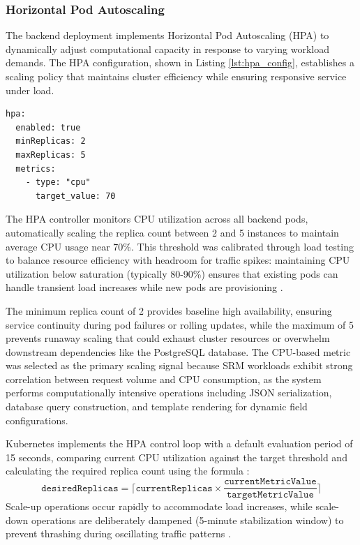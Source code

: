 \subsubsection{Horizontal Pod Autoscaling}

The backend deployment implements Horizontal Pod Autoscaling (HPA) to dynamically adjust computational capacity in response to varying workload demands. The HPA configuration, shown in Listing \ref{lst:hpa_config}, establishes a scaling policy that maintains cluster efficiency while ensuring responsive service under load.

\begin{listing}[htbp]
\begin{verbatim}
hpa:
  enabled: true
  minReplicas: 2
  maxReplicas: 5
  metrics:
    - type: "cpu"
      target_value: 70
\end{verbatim}
\caption{Horizontal Pod Autoscaler Configuration}
\label{lst:hpa_config}
\end{listing}

The HPA controller monitors CPU utilization across all backend pods, automatically scaling the replica count between 2 and 5 instances to maintain average CPU usage near 70\%. This threshold was calibrated through load testing to balance resource efficiency with headroom for traffic spikes: maintaining CPU utilization below saturation (typically 80-90\%) ensures that existing pods can handle transient load increases while new pods are provisioning \cite{nguyen2020horizontal}.

The minimum replica count of 2 provides baseline high availability, ensuring service continuity during pod failures or rolling updates, while the maximum of 5 prevents runaway scaling that could exhaust cluster resources or overwhelm downstream dependencies like the PostgreSQL database. The CPU-based metric was selected as the primary scaling signal because SRM workloads exhibit strong correlation between request volume and CPU consumption, as the system performs computationally intensive operations including JSON serialization, database query construction, and template rendering for dynamic field configurations.

Kubernetes implements the HPA control loop with a default evaluation period of 15 seconds, comparing current CPU utilization against the target threshold and calculating the required replica count using the formula \cite{nguyen2020horizontal}: 
$$
\texttt{desiredReplicas} = \lceil \texttt{currentReplicas} \times \frac{\texttt{currentMetricValue}}{\texttt{targetMetricValue}} \rceil
$$ 
Scale-up operations occur rapidly to accommodate load increases, while scale-down operations are deliberately dampened (5-minute stabilization window) to prevent thrashing during oscillating traffic patterns \cite{nguyen2020horizontal}.

